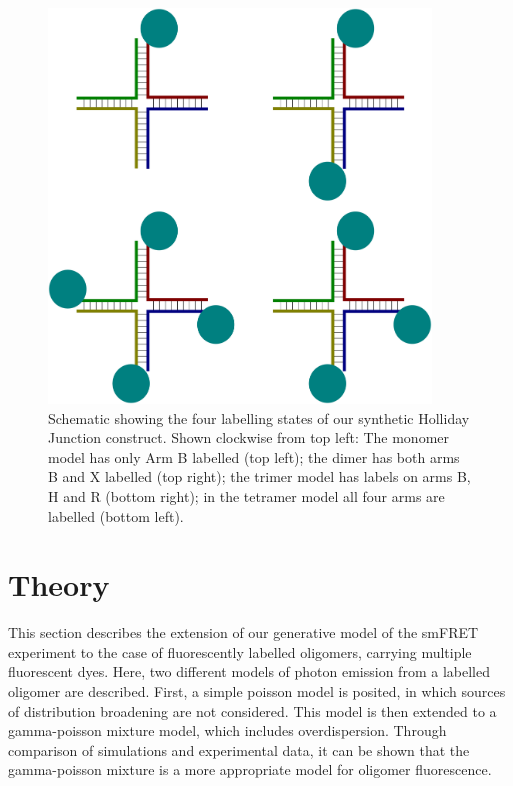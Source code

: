 \begin{figure}
   \begin{center}
      \includegraphics*[clip=true, width=4in]{sizing/holliday_junction_labelling.pdf}
      \caption{Schematic showing the four labelling states of our synthetic Holliday Junction construct. Shown clockwise from top left: The monomer model has only Arm B labelled (top left); the dimer has both arms B and X labelled (top right); the trimer model has labels on arms B, H and R (bottom right); in the tetramer model all four arms are labelled (bottom left).}
      \label{fig:holliday_junction_labelling}
   \end{center}
\end{figure}

\section{Theory}

This section describes the extension of our generative model of the smFRET experiment to the case of fluorescently labelled oligomers, carrying multiple fluorescent dyes. Here, two different models of photon emission from a labelled oligomer are described. First, a simple poisson model is posited, in which sources of distribution broadening are not considered. This model is then extended to a gamma-poisson mixture model, which includes overdispersion. Through comparison of simulations and experimental data, it can be shown that the gamma-poisson mixture is a more appropriate model for oligomer fluorescence.

